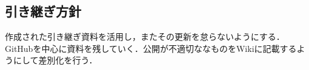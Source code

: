 \subsection*{引き継ぎ方針}


作成された引き継ぎ資料を活用し，またその更新を怠らないようにする．
GitHubを中心に資料を残していく．公開が不適切ななものをWikiに記載するようにして差別化を行う．
